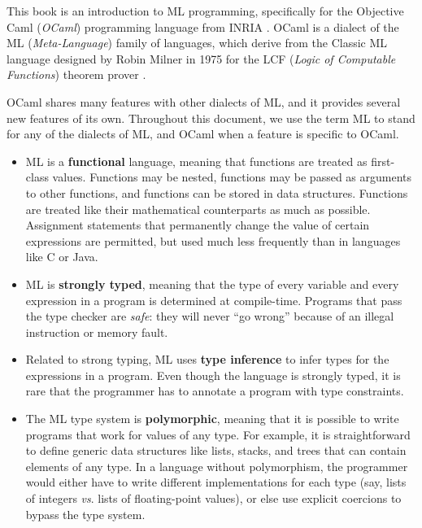 
This book is an introduction to ML programming, specifically for
the Objective Caml (\emph{OCaml}) programming language from INRIA
\cite{Ler02,RV97}.  OCaml is a dialect of the ML
(\emph{Meta-Language}) family of languages, which derive from the
Classic ML language designed by Robin Milner in 1975 for the LCF
(\emph{Logic of Computable Functions}) theorem prover
\cite{GMW79}.

OCaml shares many features with other dialects of ML, and it provides
several new features of its own.  Throughout this document, we use the
term ML to stand for any of the dialects of ML, and OCaml when a
feature is specific to OCaml.

\begin{itemize}
\item{{ML is a \textbf{functional} language, meaning that functions are
treated as first-class values.  Functions may be nested, functions may
be passed as arguments to other functions, and functions can be stored
in data structures.  Functions are treated like their mathematical
counterparts as much as possible.  Assignment statements that
permanently change the value of certain expressions are permitted, but used
much less frequently than in languages like C or Java.}}

\item{{
ML is \textbf{strongly typed}, meaning that the type of every variable
and every expression in a program is determined at compile-time.
Programs that pass the type checker are \emph{safe}: they will never
``go wrong'' because of an illegal instruction or memory fault.}}

\item{{
Related to strong typing, ML uses \textbf{type inference} to infer
types for the expressions in a program.  Even though the language is
strongly typed, it is rare that the programmer has to annotate a
program with type constraints.}}

\item{{
The ML type system is \textbf{polymorphic}, meaning that it is possible
to write programs that work for values of any type.  For example, it
is straightforward to define generic data structures like lists, stacks, and
trees that can contain elements of any type.  In a language without polymorphism,
the programmer would either have to write different
implementations for each type (say, lists of integers \emph{vs}.{} lists of
floating-point values), or else use explicit coercions to bypass the
type system.}}


\end{itemize}
